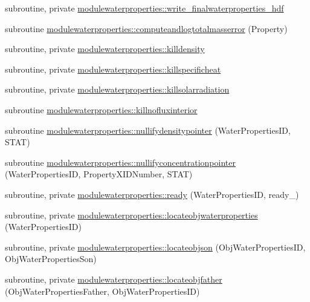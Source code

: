 \begin{DoxyCompactItemize}
\item 
subroutine, private \mbox{\hyperlink{namespacemodulewaterproperties_a2893cea8ca427b1290aeb65593659aa0}{modulewaterproperties\+::write\+\_\+finalwaterproperties\+\_\+hdf}}
\item 
subroutine \mbox{\hyperlink{namespacemodulewaterproperties_af1b9165b0e72747e4478868c7e5eff00}{modulewaterproperties\+::computeandlogtotalmasserror}} (Property)
\item 
subroutine, private \mbox{\hyperlink{namespacemodulewaterproperties_aa8cc31da812d7fc89d0dcc1d1fafac2f}{modulewaterproperties\+::killdensity}}
\item 
subroutine, private \mbox{\hyperlink{namespacemodulewaterproperties_a801b2f175ad723ebc00e21ea2c6616cf}{modulewaterproperties\+::killspecificheat}}
\item 
subroutine, private \mbox{\hyperlink{namespacemodulewaterproperties_a656b771bc1432d56a5e5701857e3c914}{modulewaterproperties\+::killsolarradiation}}
\item 
subroutine \mbox{\hyperlink{namespacemodulewaterproperties_ad2bfc0be1f4f81fc71b67a511411698e}{modulewaterproperties\+::killnofluxinterior}}
\item 
subroutine \mbox{\hyperlink{namespacemodulewaterproperties_a36c17f1a6e6a657a207beb63be984d2a}{modulewaterproperties\+::nullifydensitypointer}} (Water\+Properties\+ID, S\+T\+AT)
\item 
subroutine \mbox{\hyperlink{namespacemodulewaterproperties_aded20695e00a7e2a2792781914847187}{modulewaterproperties\+::nullifyconcentrationpointer}} (Water\+Properties\+ID, Property\+X\+I\+D\+Number, S\+T\+AT)
\item 
subroutine, private \mbox{\hyperlink{namespacemodulewaterproperties_ad54774dedce486739249cb10b4de21e2}{modulewaterproperties\+::ready}} (Water\+Properties\+ID, ready\+\_\+)
\item 
subroutine, private \mbox{\hyperlink{namespacemodulewaterproperties_ae4516d6c7f3687b0293515314b0ade90}{modulewaterproperties\+::locateobjwaterproperties}} (Water\+Properties\+ID)
\item 
subroutine, private \mbox{\hyperlink{namespacemodulewaterproperties_aa9cca4cb017da12a540fca143edcc19f}{modulewaterproperties\+::locateobjson}} (Obj\+Water\+Properties\+ID, Obj\+Water\+Properties\+Son)
\item 
subroutine, private \mbox{\hyperlink{namespacemodulewaterproperties_abe99a26b781f6af9708e4db390fcdcba}{modulewaterproperties\+::locateobjfather}} (Obj\+Water\+Properties\+Father, Obj\+Water\+Properties\+ID)

\end{DoxyCompactItemize}
